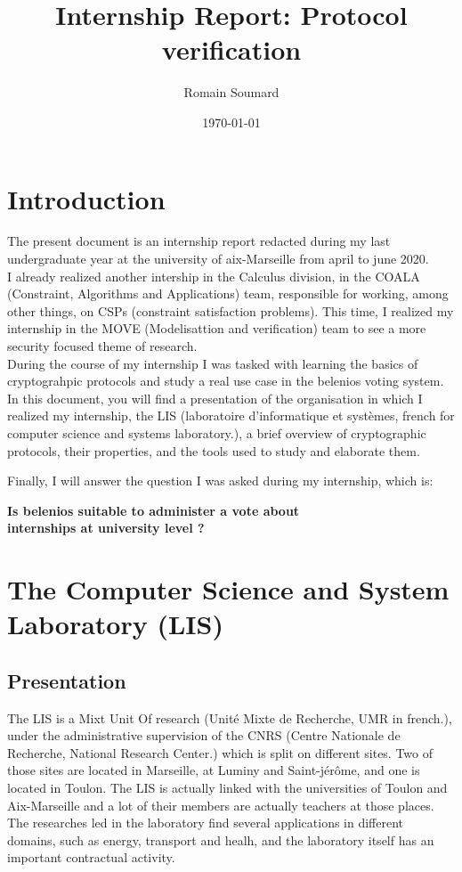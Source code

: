 \documentclass[12pt, a4paper]{report}
\title{\color{blue}Internship Report: Protocol verification}
\author{Romain Soumard}
\date{\today}
\begin{document}
\maketitle
\tableofcontents
\newpage
\section{Introduction}

The present document is an internship report redacted during my last undergraduate year at the university of aix-Marseille from april to june 2020.\\ 

I already realized another intership in the Calculus division, in the COALA (Constraint, Algorithms and Applications) team, responsible for working, among other things, on CSPs (constraint satisfaction problems). This time, I realized my internship in the MOVE (Modelisattion and verification) team to see a more security focused theme of research.\\

During the course of my internship I was tasked with learning the basics of cryptograhpic protocols and study a real use case in the belenios voting system.
In this document, you will find a presentation of the organisation in which I realized my internship, the LIS (laboratoire d'informatique et systèmes, french for computer science and systems laboratory.), a brief overview of cryptographic protocols, their properties, and the tools used to study and elaborate them.

Finally, I will answer the question I was asked during my internship, which is:\\

\begin{center}
\textbf{Is belenios suitable to administer a vote about\\ internships at university level ?}

\end{center}
 

\section{The Computer Science and System Laboratory (LIS)}

\subsection{Presentation}

The LIS is a Mixt Unit Of research (Unité Mixte de Recherche, UMR in french.), under the administrative supervision of the CNRS (Centre Nationale de Recherche, National Research Center.) which is split on different sites.
Two of those sites are located in Marseille, at Luminy and Saint-jérôme, and one is located in Toulon.
The LIS is actually linked with the universities of Toulon and Aix-Marseille and a lot of their members are actually teachers at those places.
The researches led in the laboratory find several applications in different domains, such as energy, transport and healh, and the laboratory itself has an important contractual activity.
\end{document}
